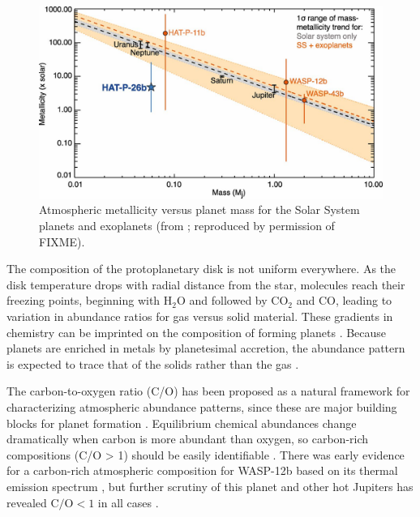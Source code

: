 \documentclass[graybox,natbib,nosecnum]{svmult}
\begin{document}
\begin{figure}
\begin{centering}
\includegraphics[scale=.8]{Figures/wakeford.jpg}
\caption{Atmospheric metallicity versus planet mass for the Solar System planets and exoplanets (from \citealt{wakeford17}; reproduced by permission of FIXME).  }
\label{fig:massZ}       
\end{centering}
\end{figure}

The composition of the protoplanetary disk is not uniform everywhere. As the disk temperature drops with radial distance from the star, molecules reach their freezing points, beginning with H$_2$O and followed by CO$_2$ and CO, leading to variation in abundance ratios for gas versus solid material. These gradients in chemistry can be imprinted on the composition of forming planets \citep[e.g.][]{oberg11, madhusudhan14, alidib16}. Because planets are enriched in metals by planetesimal accretion, the abundance pattern is expected to trace that of the solids rather than the gas \citep{mordasini16, espinoza17}.

The carbon-to-oxygen ratio (C/O) has been proposed as a natural framework for characterizing atmospheric abundance patterns, since these are major building blocks for planet formation \citep{madhusudhan12}.  Equilibrium chemical abundances change dramatically when carbon is more abundant than oxygen, so carbon-rich compositions (C/O > 1) should be easily identifiable \citep{moses13}.  There was early evidence for a carbon-rich atmospheric composition for WASP-12b based on its thermal emission spectrum \citep{madhusudhan11}, but further scrutiny of this planet and other hot Jupiters has revealed $\mathrm{C/O} < 1$ in all cases \citep{line14, kreidberg15b, benneke15, barstow17}. 
\end{document}
